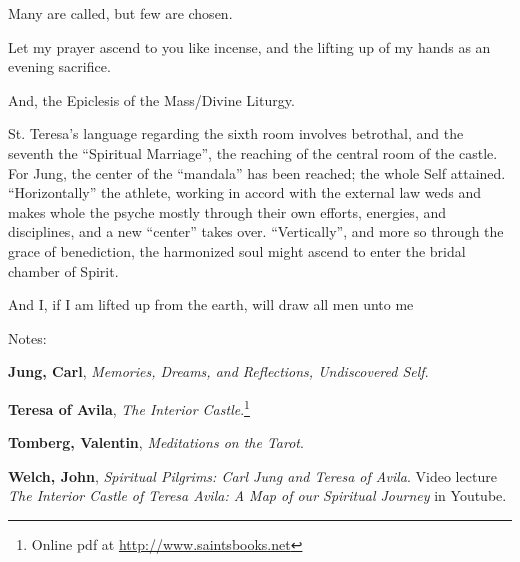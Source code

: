 \begin{quotex}
Many are called, but few are chosen.

Let my prayer ascend to you like incense, and the lifting up of my hands as an evening sacrifice.
\end{quotex}

And, the Epiclesis of the Mass/Divine Liturgy.

St. Teresa's language regarding the sixth room involves betrothal, and the seventh the ``Spiritual Marriage'', the reaching of the central room of the castle. For Jung, the center of the ``mandala'' has been reached; the whole Self attained. ``Horizontally'' the athlete, working in accord with the external law weds and makes whole the psyche mostly through their own efforts, energies, and disciplines, and a new ``center'' takes over. ``Vertically'', and more so through the grace of benediction, the harmonized soul might ascend to enter the bridal chamber of Spirit.

\begin{quotex}
And I, if I am lifted up from the earth, will draw all men unto me
\end{quotex}

Notes:

\textbf{Jung, Carl}, \textit{Memories, Dreams, and Reflections, Undiscovered Self}.

\textbf{Teresa of Avila}, \textit{The Interior Castle}.\footnote{Online pdf at \url{http://www.saintsbooks.net}}

\textbf{Tomberg, Valentin}, \textit{Meditations on the Tarot}.


\textbf{Welch, John}, \textit{Spiritual Pilgrims: Carl Jung and Teresa of Avila}. Video lecture \textit{The Interior Castle of Teresa Avila: A Map of our Spiritual Journey} in Youtube.


